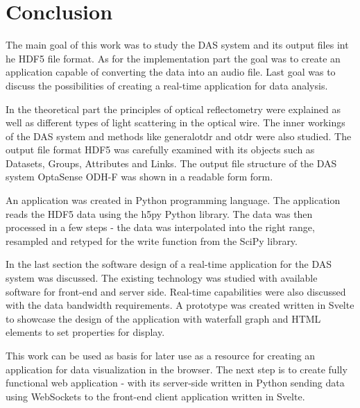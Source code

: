 \chapter*{Conclusion}
{}

The main goal of this work was to study the DAS system and its output files int he HDF5 file format. As for the implementation part the goal was to create an application capable of converting the data into an audio file. Last goal was to discuss the possibilities of creating a real-time application for data analysis. 

In the theoretical part the principles of optical reflectometry were explained as well as different types of light scattering in the optical wire. The inner workings of the DAS system and methods like \ac{generalotdr} and \ac{otdr} were also studied. The output file format HDF5 was carefully examined with its objects such as Datasets, Groups, Attributes and Links. The output file structure of the DAS system OptaSense ODH-F was shown in a readable form form. 

An application was created in Python programming language. The application reads the HDF5 data using the h5py Python library. The data was then processed in a few steps - the data was interpolated into the right range, resampled and retyped for the write function from the SciPy library. 

In the last section the software design of a real-time application for the DAS system was discussed. The existing technology was studied with available software for front-end and server side. Real-time capabilities were also discussed with the data bandwidth requirements. A prototype was created written in Svelte to showcase the design of the application with waterfall graph and HTML elements to set properties for display. 

This work can be used as basis for later use as a resource for creating an application for data visualization in the browser. The next step is to create fully functional web application - with its server-side written in Python sending data using WebSockets to the front-end client application written in Svelte.






